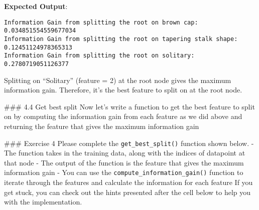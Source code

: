 \documentclass[11pt]{article}
\begin{document}
    \textbf{Expected Output}:

\begin{verbatim}
Information Gain from splitting the root on brown cap:  0.034851554559677034
Information Gain from splitting the root on tapering stalk shape:  0.12451124978365313
Information Gain from splitting the root on solitary:  0.2780719051126377
\end{verbatim}

    Splitting on ``Solitary'' (feature = 2) at the root node gives the
maximum information gain. Therefore, it's the best feature to split on
at the root node.

    \#\#\# 4.4 Get best split Now let's write a function to get the best
feature to split on by computing the information gain from each feature
as we did above and returning the feature that gives the maximum
information gain

\#\#\# Exercise 4 Please complete the \texttt{get\_best\_split()}
function shown below. - The function takes in the training data, along
with the indices of datapoint at that node - The output of the function
is the feature that gives the maximum information gain - You can use the
\texttt{compute\_information\_gain()} function to iterate through the
features and calculate the information for each feature If you get
stuck, you can check out the hints presented after the cell below to
help you with the implementation.
\end{document}
